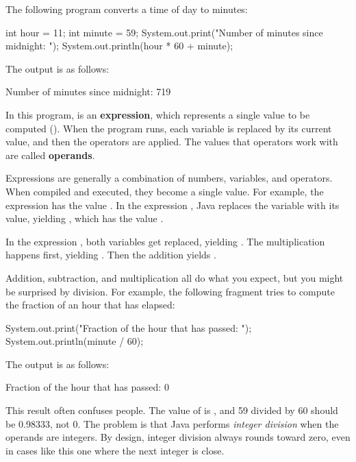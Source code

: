 The following program converts a time of day to minutes:

\begin{code}
int hour = 11;
int minute = 59;
System.out.print("Number of minutes since midnight: ");
System.out.println(hour * 60 + minute);
\end{code}

The output is as follows:

\begin{stdout}
Number of minutes since midnight: 719
\end{stdout}


In this program,  is an {\bf expression}, which represents a single value to be computed ().
When the program runs, each variable is replaced by its current value, and then the operators are applied.
The values that operators work with are called {\bf operands}.

Expressions are generally a combination of numbers, variables, and operators.
When compiled and executed, they become a single value.
For example, the expression  has the value .
In the expression , Java replaces the variable with its value, yielding , which has the value .

In the expression , both variables get replaced, yielding .
The multiplication happens first, yielding .
Then the addition yields .

Addition, subtraction, and multiplication all do what you expect, but you might be surprised by division.
For example, the following fragment tries to compute the fraction of an hour that has elapsed:%

\begin{code}
System.out.print("Fraction of the hour that has passed: ");
System.out.println(minute / 60);
\end{code}

The output is as follows:

\begin{stdout}
Fraction of the hour that has passed: 0
\end{stdout}


This result often confuses people.
The value of  is , and 59 divided by 60 should be 0.98333, not 0.
The problem is that Java performs {\em integer division} when the operands are integers.
By design, integer division always rounds toward zero, even in cases like this one where the next integer is close.

